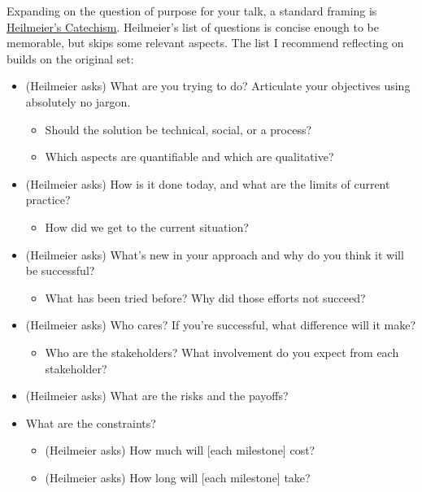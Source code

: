 Expanding on the question of purpose for your talk, a standard framing is 
\href{https://en.wikipedia.org/wiki/George_H._Heilmeier\%23Heilmeier's_Catechism}{Heilmeier's Catechism}.
Heilmeier's list of questions is concise enough to be memorable, but skips some relevant aspects. The list I recommend reflecting on builds on the original set:
\begin{itemize}
    \item (Heilmeier asks) What are you trying to do? Articulate your objectives using absolutely no jargon.
    \begin{itemize}
        \item Should the solution be technical, social, or a process?
        \item Which aspects are quantifiable and which are qualitative?
    \end{itemize}
    \item (Heilmeier asks) How is it done today, and what are the limits of current practice?
    \begin{itemize}
        \item How did we get to the current situation? 
    \end{itemize}
    \item (Heilmeier asks) What's new in your approach and why do you think it will be successful?
    \begin{itemize}
        \item What has been tried before? Why did those efforts not succeed?
    \end{itemize}
    \item (Heilmeier asks) Who cares? If you're successful, what difference will it make?
    \begin{itemize}
        \item Who are the stakeholders? What involvement do you expect from each stakeholder?
    \end{itemize}
    \item (Heilmeier asks) What are the risks and the payoffs?
    \item What are the constraints?
    \begin{itemize}
        \item (Heilmeier asks) How much will [each milestone] cost?
        \item (Heilmeier asks) How long will [each milestone] take?

\end{itemize}
\end{itemize}
